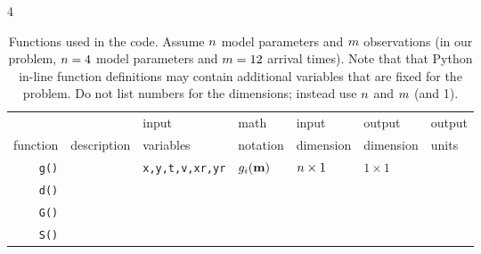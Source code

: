 \begin{table}[h]
\caption[]{{
Functions used in the code.
Assume $n$ model parameters and $m$ observations (in our problem, $n=4$ model parameters and $m=12$ arrival times).
Note that that Python in-line function definitions may contain additional variables that are fixed for the problem.
Do not list numbers for the dimensions; instead use $n$ and $m$ (and 1).
\label{tab:funs}
}}
\begin{spacing}{4}
\hspace{-1.2cm}
\begin{tabular}{r|l|l|l|l|l|l}
\hline
         &                          & input      & math      & input     & output    & output \\
function & description \hspace{3cm} & variables  & notation  & dimension & dimension & units \hspace{0.5cm} \\
\hline\hline 
\verb+g()+ & & {\tt x,y,t,v,xr,yr} & $g_i(\mbox{${\bf m}$})$ & $n \times 1$ & $1 \times 1$ & \\ \hline
\verb+d()+  & & & & & & \\ \hline
\verb+G()+  & & & & & & \\ \hline
\verb+S()+  & & & & & & \\ \hline
\end{tabular}
\end{spacing}
\end{table}

